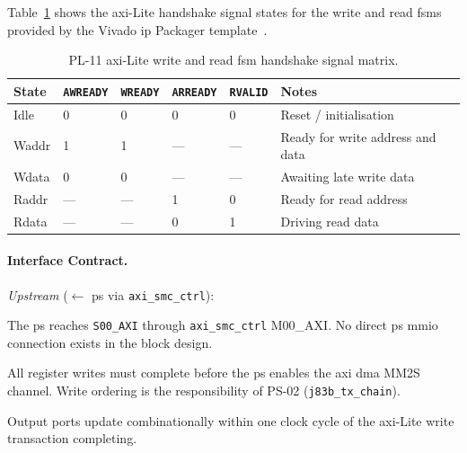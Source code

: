 Table~\ref{tab:fsm_pl11} shows the \ac{axi}-Lite handshake signal
states for the write and read \ac{fsm}s provided by the Vivado
\ac{ip} Packager template~\cite{ARM_IHI0022}.

\begin{table}[!h]
  \caption{PL-11 \ac{axi}-Lite write and read \ac{fsm} handshake
           signal matrix.}
  \label{tab:fsm_pl11}
  \centering
  \small
  \begin{tabular}{l l l l l p{4.0cm}}
    \hline
    State & \texttt{AWREADY} & \texttt{WREADY} &
            \texttt{ARREADY} & \texttt{RVALID} & Notes \\
    \hline
    Idle  & 0 & 0 & 0 & 0 & Reset / initialisation \\
    Waddr & 1 & 1 & — & — & Ready for write address and data \\
    Wdata & 0 & 0 & — & — & Awaiting late write data \\
    Raddr & — & — & 1 & 0 & Ready for read address \\
    Rdata & — & — & 0 & 1 & Driving read data \\
    \hline
  \end{tabular}
\end{table}
\FloatBarrier



\FloatBarrier
\paragraph{Interface Contract.}

\textit{Upstream} ($\leftarrow$ \ac{ps} via \texttt{axi\_smc\_ctrl}):
\begin{tightemize}
  \item The \ac{ps} reaches \texttt{S00\_AXI} through
        \texttt{axi\_smc\_ctrl} M00\_AXI. No direct \ac{ps} \ac{mmio}
        connection exists in the block design.
  \item All register writes must complete before the \ac{ps} enables the
        \ac{axi} \ac{dma} MM2S channel.
        Write ordering is the responsibility of PS-02
        (\texttt{j83b\_tx\_chain}).
  \item Output ports update combinationally within one clock cycle of
        the \ac{axi}-Lite write transaction completing.
\end{tightemize}

